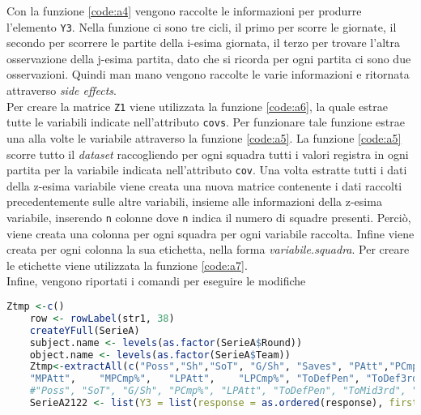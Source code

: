 Con la funzione \ref{code:a4} vengono raccolte le informazioni per produrre l'elemento \texttt{Y3}. Nella funzione ci sono tre cicli, il primo per scorre le giornate, il secondo per scorrere le partite della i-esima giornata, il terzo per trovare l'altra osservazione della j-esima partita, dato che si ricorda per ogni partita ci sono due osservazioni. Quindi man mano vengono raccolte le varie informazioni e ritornata attraverso \emph{side effects}.\\
Per creare la matrice \texttt{Z1} viene utilizzata la funzione \ref{code:a6}, la quale estrae tutte le variabili indicate nell'attributo \texttt{covs}. Per funzionare tale funzione estrae una alla volte le variabile attraverso la funzione \ref{code:a5}. La funzione \ref{code:a5} scorre tutto il \emph{dataset} raccogliendo per ogni squadra tutti i valori registra in ogni partita per la variabile indicata nell'attributo \texttt{cov}. Una volta estratte tutti i dati della z-esima variabile viene creata una nuova matrice contenente i dati raccolti precedentemente sulle altre variabili, insieme alle informazioni della z-esima variabile, inserendo \texttt{n} colonne dove \texttt{n} indica il numero di squadre presenti. Perciò, viene creata una colonna per ogni squadra per ogni variabile raccolta. Infine viene creata per ogni colonna la sua etichetta, nella forma \emph{variabile.squadra}. Per creare le etichette viene utilizzata la funzione \ref{code:a7}.\\

Infine, vengono riportati i comandi per eseguire le modifiche
\begin{lstlisting}[language=R, caption={Comandi per la creazione della lista per il pacchetto \textit{BTLLAsso}}, captionpos=b, label=sec:a9]
	Ztmp <-c()
	row <- rowLabel(str1, 38)
	createYFull(SerieA)
	subject.name <- levels(as.factor(SerieA$Round))
	object.name <- levels(as.factor(SerieA$Team))
	Ztmp<-extractAll(c("Poss","Sh","SoT", "G/Sh", "Saves", "PAtt","PCmp%", "SPAtt",    "SPCmp%",  
	"MPAtt",    "MPCmp%",   "LPAtt",    "LPCmp%", "ToDefPen", "ToDef3rd", "ToMid3rd", "ToAtt3rd", "ToAttPen", "TotDist", "Fls", "Fld", "Off", "Crs", "Int", "TklWin", "Recov"), row, object.name)
	#"Poss", "SoT", "G/Sh", "PCmp%", "LPAtt", "ToDefPen", "ToMid3rd", "ToAttPen", "Fld", "TklWin"
	SerieA2122 <- list(Y3 = list(response = as.ordered(response), first.object = as.double(first.object), second.object = as.double(second.object), subject = subject, withS = TRUE, subject.names = subject.name, object.names = object.name, n = 38, m = 20, k = 3, q = 2, with.order = with.order), Z1 = Ztmp)
\end{lstlisting}
